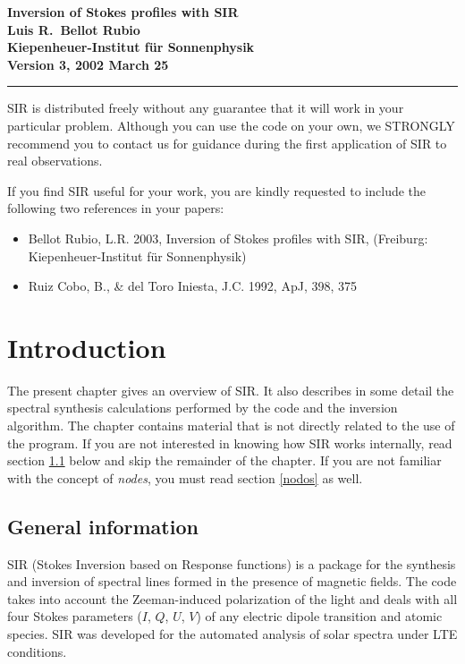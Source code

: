 \documentclass[11pt]{report}
\begin{document}
\thispagestyle{empty}
\vspace*{3cm}
\begin{center}
\Huge \bf Inversion of Stokes profiles with SIR \\
\vspace*{2cm}
\Large Luis R.\ Bellot Rubio \\
Kiepenheuer-Institut f\"ur Sonnenphysik \\
\vspace*{.5cm}
\normalsize
Version 3, 2002 March 25
\end{center}

\clearpage
\vspace*{\fill}

\hrule
\vspace*{1em}
\noindent SIR is distributed freely without any guarantee that it will work 
in your particular problem. Although you can use the code on your 
own, we STRONGLY recommend you to contact us for guidance during 
the first application of SIR to real observations.

\noindent If you find SIR useful for your work, you are kindly requested
to include the following two references in your papers:

\begin{itemize}
\item Bellot Rubio, L.R. 2003, Inversion of Stokes profiles with SIR, 
  (Freiburg: Kiepenheuer-Institut f\"ur Sonnenphysik)
\item Ruiz Cobo, B., \& del Toro Iniesta, J.C. 1992, ApJ, 398, 375 
\end{itemize}

\thispagestyle{empty}
\clearpage

\tableofcontents

\chapter{Introduction}

The present chapter gives an overview of SIR. It also describes in 
some detail the spectral synthesis calculations performed by the code 
and the inversion algorithm. The chapter contains material that
is not directly related to the use of the program. If you are not 
interested in knowing how SIR works internally, read section \ref{general}
below and skip the remainder of the chapter. If you are not familiar with
the concept of {\em nodes}, you must read section \ref{nodos} as well.


\section{General information}
\label{general}
SIR (Stokes Inversion based on Response functions) is a package for the
synthesis and inversion of spectral lines formed in the presence of
magnetic fields. The code takes into account the Zeeman-induced
polarization of the light and deals with all four Stokes parameters
($I$, $Q$, $U$, $V$) of any electric dipole transition and atomic
species. SIR was developed for the automated analysis of solar spectra
under LTE conditions.
\end{document}
